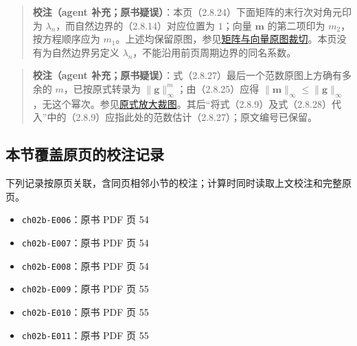 \documentclass[
  10pt,
  fontset=fandol]{ctexart}
\providecommand{\tightlist}{%
  \setlength{\itemsep}{0pt}\setlength{\parskip}{0pt}}
\begin{document}
\begin{quote}
\textbf{校注（agent 补充；原书疑误）}：本页（2.8.24）下面矩阵的末行次对角元印为 \(\lambda_n\)，而自然边界的（2.8.14）对应位置为 \(1\)；向量 \(\boldsymbol m\) 的第二项印为 \(m_2\)，按方程顺序应为 \(m_1\)。上述均保留原图，参见\href{../assets/ch02b/pdf-055-matrix-detail.png}{矩阵与向量原图裁切}。本页没有为自然边界另定义 \(\lambda_n\)，不能沿用前页周期边界的同名系数。
\end{quote}

\begin{quote}
\textbf{校注（agent 补充；原书疑误）}：式（2.8.27）最后一个范数原图上方确有多余的 \(m\)，已按原式转录为 \(\|\boldsymbol g\|_\infty^m\)；由（2.8.25）应得 \(\|\boldsymbol m\|_\infty\leqslant\|\boldsymbol g\|_\infty\)，无这个幂次。参见\href{../assets/ch02b/pdf-055-eq-2-8-27-detail.png}{原式放大裁图}。其后``将式（2.8.9）及式（2.8.28）代入''中的（2.8.9）应指此处的范数估计（2.8.27）；原文编号已保留。
\end{quote}

\subsection{本节覆盖原页的校注记录}\label{ux672cux8282ux8986ux76d6ux539fux9875ux7684ux6821ux6ce8ux8bb0ux5f55}

下列记录按原页关联，含同页相邻小节的校注；计算时同时读取上文校注和完整原页。

\begin{itemize}
\tightlist
\item
  \texttt{ch02b-E006}：原书 PDF 页 54
\item
  \texttt{ch02b-E007}：原书 PDF 页 54
\item
  \texttt{ch02b-E008}：原书 PDF 页 54
\item
  \texttt{ch02b-E009}：原书 PDF 页 55
\item
  \texttt{ch02b-E010}：原书 PDF 页 55
\item
  \texttt{ch02b-E011}：原书 PDF 页 55
\end{itemize}
\end{document}
